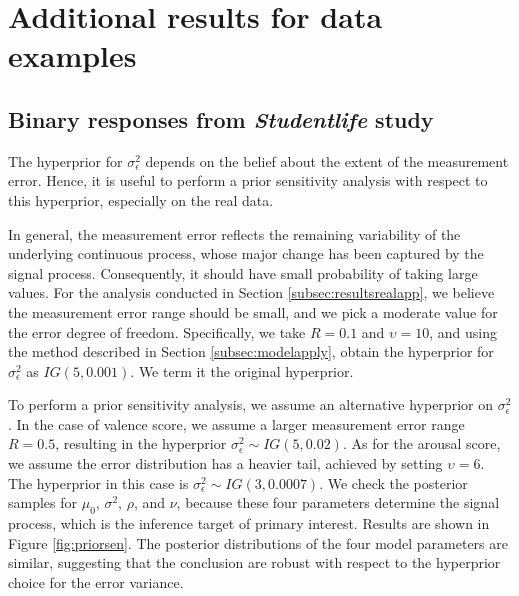 \section{Additional results for data examples}
\label{sec:dataaddresults}

\subsection{Binary responses from \textit{Studentlife} study}

The hyperprior for $\sigma_{\epsilon}^2$ depends on the belief about the extent 
of the measurement error. Hence, it is useful to perform a prior sensitivity 
analysis with respect to this hyperprior, especially on the real data. 


In general, the measurement error reflects the remaining variability of the 
underlying continuous process, whose major change has been captured by the signal 
process. Consequently, it should have small probability of taking large values. 
For the analysis conducted in Section \ref{subsec:resultsrealapp},
we believe the measurement error range should be small, and we pick a 
moderate value for the error degree of freedom. Specifically, we 
take $R=0.1$ and $\upsilon=10$, and using the method described in 
Section \ref{subsec:modelapply}, obtain the hyperprior for 
$\sigma_{\epsilon}^2$ as $IG(5,0.001)$. We term it the original hyperprior.


To perform a prior sensitivity analysis, we assume an alternative hyperprior 
on $\sigma_{\epsilon}^2$. In the case of valence score, we assume a larger 
measurement error range $R=0.5$, resulting in the hyperprior 
$\sigma_{\epsilon}^2\sim IG(5,0.02)$. As for the arousal score, we assume 
the error distribution has a heavier tail, achieved by setting 
$\upsilon=6$. The hyperprior in this case is $\sigma_{\epsilon}^2\sim IG(3,0.0007)$.
We check the posterior samples for $\mu_0$, $\sigma^2$, $\rho$, and $\nu$, 
because these four parameters determine the signal process, which is the 
inference target of primary interest. Results are shown in 
Figure \ref{fig:priorsen}. The posterior distributions of the four model 
parameters are similar, suggesting that the conclusion are robust with 
respect to the hyperprior choice for the error variance.

